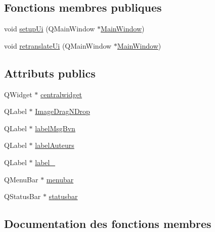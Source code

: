 \subsection*{Fonctions membres publiques}
\begin{DoxyCompactItemize}
\item 
void \hyperlink{class_ui___main_window_acf4a0872c4c77d8f43a2ec66ed849b58}{setup\+Ui} (Q\+Main\+Window $\ast$\hyperlink{class_main_window}{Main\+Window})
\item 
void \hyperlink{class_ui___main_window_a097dd160c3534a204904cb374412c618}{retranslate\+Ui} (Q\+Main\+Window $\ast$\hyperlink{class_main_window}{Main\+Window})
\end{DoxyCompactItemize}
\subsection*{Attributs publics}
\begin{DoxyCompactItemize}
\item 
Q\+Widget $\ast$ \hyperlink{class_ui___main_window_a356f1cf3ebda15f1fac59467ee081b74}{centralwidget}
\item 
Q\+Label $\ast$ \hyperlink{class_ui___main_window_ab0067ac42360f3cf2bb414b788d22f8e}{Image\+Drag\+N\+Drop}
\item 
Q\+Label $\ast$ \hyperlink{class_ui___main_window_a06205a0a8713b97da37a408c9dd3058e}{label\+Msg\+Bvn}
\item 
Q\+Label $\ast$ \hyperlink{class_ui___main_window_ae3a2caa0dbf4539a0bd06f4e35ddc537}{label\+Auteurs}
\item 
Q\+Label $\ast$ \hyperlink{class_ui___main_window_a2e2516d755e4dd53fc905dabddf2738a}{label\+\_}
\item 
Q\+Menu\+Bar $\ast$ \hyperlink{class_ui___main_window_adf43d9a67adaec750aaa956b5e082f09}{menubar}
\item 
Q\+Status\+Bar $\ast$ \hyperlink{class_ui___main_window_a1687cceb1e2787aa1f83e50433943a91}{statusbar}
\end{DoxyCompactItemize}


\subsection{Documentation des fonctions membres}
\mbox{\label{class_ui___main_window_a097dd160c3534a204904cb374412c618}} 
